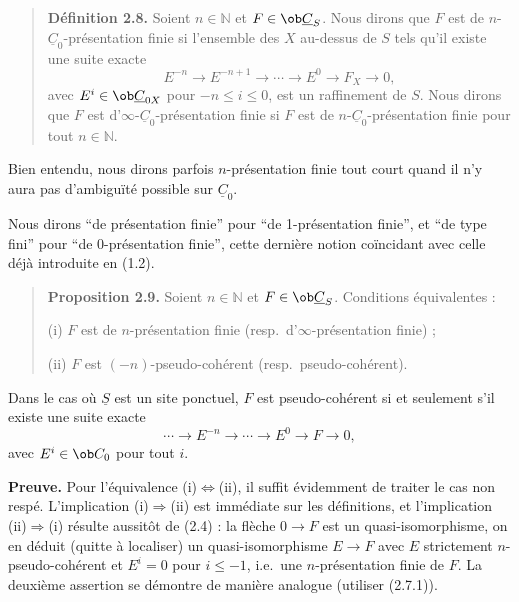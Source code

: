 \begin{quote}
\textbf{Définition 2.8.} Soient $n \in \mathbb{N}$ et $F \in \ob \underline{C}_S$. Nous dirons que $F$ est de $n$-$\underline{C}_0$-présentation finie si l'ensemble des $X$ au-dessus de $S$ tels qu'il existe une suite exacte
\[
E^{-n} \longrightarrow E^{-n+1} \longrightarrow \cdots \longrightarrow E^0 \longrightarrow F_X \longrightarrow 0,
\]
avec $E^i \in \ob \underline{C}_{0X}$ pour $-n \leqslant i \leqslant 0$, est un raffinement de $S$. Nous dirons que $F$ est d'$\infty$-$\underline{C}_0$-présentation finie si $F$ est de $n$-$\underline{C}_0$-présentation finie pour tout $n \in \mathbb{N}$.
\end{quote}

Bien entendu, nous dirons parfois $n$-présentation finie tout court quand il n'y aura pas d'ambiguïté possible sur $\underline{C}_0$.

Nous dirons ``de présentation finie'' pour ``de 1-présentation finie'', et ``de type fini'' pour ``de 0-présentation finie'', cette dernière notion coïncidant avec celle déjà introduite en (1.2).

\begin{quote}
\textbf{Proposition 2.9.} Soient $n \in \mathbb{N}$ et $F \in \ob \underline{C}_S$. Conditions équivalentes :

\quad\textup{(i)} $F$ est de $n$-présentation finie (resp.\ d'$\infty$-présentation finie) ;

\quad\textup{(ii)} $F$ est $(-n)$-pseudo-cohérent (resp.\ pseudo-cohérent).
\end{quote}

Dans le cas où $\underline{S}$ est un site ponctuel, $F$ est pseudo-cohérent si et seulement s'il existe une suite exacte
\[
\cdots \longrightarrow E^{-n} \longrightarrow \cdots \longrightarrow E^0 \longrightarrow F \longrightarrow 0,
\]
avec $E^i \in \ob C_0$ pour tout $i$.

\textbf{Preuve.} Pour l'équivalence (i)$\Leftrightarrow$(ii), il suffit évidemment de traiter le cas non respé. L'implication (i)$\Rightarrow$(ii) est immédiate sur les définitions, et l'implication (ii)$\Rightarrow$(i) résulte aussitôt de (2.4) : la flèche $0 \to F$ est un quasi-isomorphisme, on en déduit (quitte à localiser) un quasi-isomorphisme $E \to F$ avec $E$ strictement $n$-pseudo-cohérent et $E^i = 0$ pour $i \leqslant -1$, i.e.\ une $n$-présentation finie de $F$. La deuxième assertion se démontre de manière analogue (utiliser (2.7.1)).


